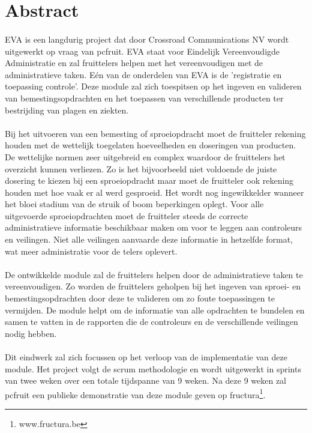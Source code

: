 \section* {Abstract}

\paragraph {} EVA is een langdurig project dat door Crossroad Communications NV wordt
uitgewerkt op vraag van pcfruit. EVA staat voor Eindelijk Vereenvoudigde Administratie en
zal fruittelers helpen met het vereenvoudigen met de administratieve taken. Eén van de
onderdelen van EVA is de 'registratie en toepassing controle'. Deze module zal zich
toespitsen op het ingeven en valideren van bemestingsopdrachten en het toepassen van
verschillende producten ter bestrijding van plagen en ziekten.

\paragraph {} Bij het uitvoeren van een bemesting of sproeiopdracht moet de fruitteler rekening
houden met de wettelijk toegelaten hoeveelheden en doseringen van producten. De wettelijke
normen zeer uitgebreid en complex waardoor de fruittelers het overzicht kunnen
verliezen. Zo is het bijvoorbeeld niet voldoende de juiste dosering te kiezen bij een
sproeiopdracht maar moet de fruitteler ook rekening houden met hoe vaak er al werd gesproeid.
Het wordt nog
ingewikkelder wanneer het bloei stadium van de struik of boom beperkingen oplegt. Voor alle
uitgevoerde sproeiopdrachten moet de fruitteler steeds de correcte administratieve informatie
beschikbaar maken om voor te leggen aan controleurs en veilingen. Niet alle veilingen
aanvaarde deze informatie in hetzelfde format, wat meer administratie voor de telers
oplevert.

\paragraph {} De ontwikkelde module zal de fruittelers helpen door de administratieve taken te
vereenvoudigen. Zo worden de fruittelers geholpen bij het ingeven van sproei- en
bemestingsopdrachten door deze te valideren om zo foute toepassingen te vermijden. De
module helpt om de informatie van alle opdrachten te bundelen en samen te vatten in de
rapporten die de controleurs en de verschillende veilingen nodig hebben.

\paragraph {} Dit eindwerk zal zich focussen op het verloop van de implementatie van deze
module. Het project volgt de scrum methodologie en wordt uitgewerkt in sprints van twee
weken over een totale tijdspanne van 9 weken. Na deze 9 weken zal pcfruit een publieke
demonstratie van deze module geven op fructura\footnote{www.fructura.be}.

